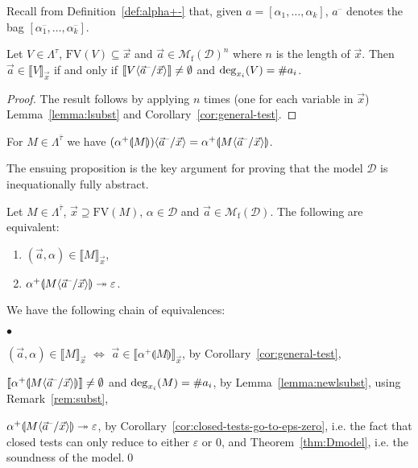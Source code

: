 \documentclass{LMCS}
\newcommand{\card}[1]{\# #1}
\renewcommand{\hole}[1]{\llparenthesis #1\rrparenthesis}
\newcommand{\FV}{\mathrm{FV}}
\newcommand{\Set}[1]{\Lambda^{#1}}
\newcommand{\msto}{\twoheadrightarrow}
\newcommand{\Int}[1]{\llbracket #1\rrbracket} \newcommand{\trm}[1]{#1^{\textrm{--}}}
\newcommand{\cont}[2]{#1^{+}\hole{#2}}
\newcommand{\Mfin}[1]{\mathcal{M}_{\mathrm{f}}(#1)}
\renewcommand{\iff}{\Leftrightarrow}
\newcommand{\seq}[1]{\vec{#1}}
\newcommand{\ga}{\alpha}
\newcommand{\gt}{\ensuremath{\tau}}
\newcommand{\gto}{\ensuremath{\bar\tau}}
\newcommand{\cD}{\mathcal{D}}
\begin{document}
Recall from Definition~\ref{def:alpha+-} that, given $a = [\ga_1,\ldots,\ga_k]$, 
$\trm{a}$ denotes the bag $[\trm{\ga_1},\ldots,\trm{\ga_k}]$.

\begin{lem}\label{lemma:newlsubst}
Let $V\in \Set{\gt}$, $\FV(V)\subseteq \seq x$ and $\seq a\in\Mfin{\cD}^n$ where $n$ is the length of $\seq x$. 
Then $\seq{a} \in \Int{V}_{\seq{x}}$ if and only if $ \Int{V\lsubst{\seq{x}}{\trm{\seq{a}}}}\neq \emptyset$ and $\dg{x_i}{V} = \card a_i$.
\end{lem}

\begin{proof}
The result follows by applying $n$ times (one for each variable in $\seq{x}$) Lemma~\ref{lemma:lsubst} and Corollary~\ref{cor:general-test}.
\end{proof}

\begin{rem}\label{rem:subst}
For $M\in\Set{\gto}$ we have $(\cont{\ga}{M})\lsubst{\seq x}{\trm{\seq{a}}} = \cont{\ga}{M\lsubst{\seq x}{\trm{\seq{a}}}}$.
\end{rem}

The ensuing proposition is the key argument for proving that the model $\cD$ is inequationally fully abstract.

\begin{prop}\label{prop:context}
Let $M \in \Set{\gto}$, $\seq{x}\supseteq\FV(M)$, $\alpha\in \cD$ and $\seq a\in\Mfin{\cD}$. 
The following are equivalent:
\begin{enumerate}[\em(i)]
\item $(\seq{a},\alpha) \in \Int{M}_{\seq{x}}$,
\item $\cont{\alpha}{M\lsubst{\seq{x}}{\trm{\seq{a}}}}\msto \varepsilon$.
\end{enumerate}
\end{prop}

\proof We have the following chain of equivalences: 
\begin{iteMize}{$\bullet$}
\item[\ ]$(\seq{a},\alpha) \in \Int{M}_{\seq{x}}$ 
$\iff$ $\seq a \in \Int{\cont{\ga}{M}}_{\seq{x}}$, by Corollary~\ref{cor:general-test},
\item[$\iff$] $\Int{\cont{\ga}{M\lsubst{\seq x}{\trm{\seq{a}}}}}\neq\emptyset$ and $\dg{x_i}{M} = \card a_i$, by Lem\-ma~\ref{lemma:newlsubst}, using Remark~\ref{rem:subst},
\item[$\iff$] $\cont{\ga}{M\lsubst{\seq x}{\trm{\seq a}}}\msto\varepsilon$, by Corollary~\ref{cor:closed-tests-go-to-eps-zero}, i.e. the fact that closed tests can only reduce to either $\varepsilon$ or $0$, and Theorem~\ref{thm:Dmodel}, i.e. the soundness of the model.\qed
\end{iteMize}
\end{document}
